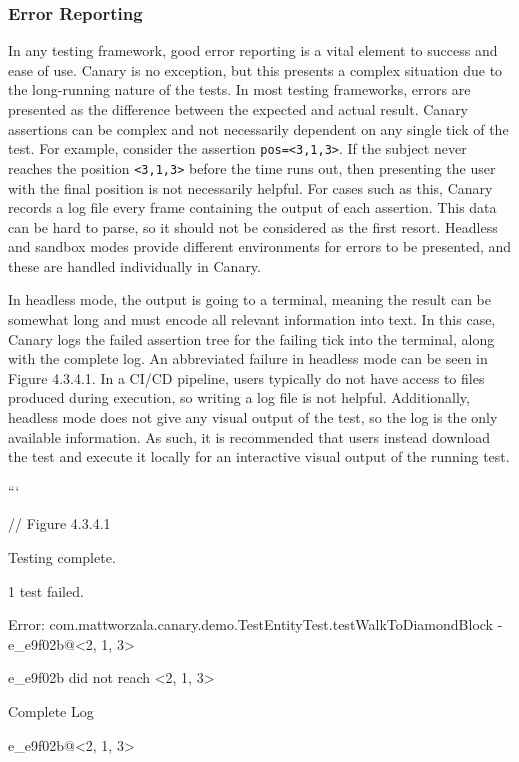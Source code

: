 \documentclass{article}
\def\code#1{\texttt{#1}}
\begin{document}
\begin{onehalfspacing}
\subsubsection{Error Reporting}

In any testing framework, good error reporting is a vital element to
success and ease of use. Canary is no exception, but this presents a
complex situation due to the long-running nature of the tests. In most
testing frameworks, errors are presented as the difference between the
expected and actual result. Canary assertions can be complex and not
necessarily dependent on any single tick of the test. For example,
consider the assertion \code{pos=\textless3,1,3\textgreater{}}. If the subject
never reaches the position \code{\textless3,1,3\textgreater{}} before the time
runs out, then presenting the user with the final position is not
necessarily helpful. For cases such as this, Canary records a log file
every frame containing the output of each assertion. This data can be
hard to parse, so it should not be considered as the first resort.
Headless and sandbox modes provide different environments for errors to
be presented, and these are handled individually in Canary.

In headless mode, the output is going to a terminal, meaning the result
can be somewhat long and must encode all relevant information into text.
In this case, Canary logs the failed assertion tree for the failing tick
into the terminal, along with the complete log. An abbreviated failure
in headless mode can be seen in Figure 4.3.4.1. In a CI/CD pipeline,
users typically do not have access to files produced during execution,
so writing a log file is not helpful. Additionally, headless mode does
not give any visual output of the test, so the log is the only available
information. As such, it is recommended that users instead download the
test and execute it locally for an interactive visual output of the
running test.

```

// Figure 4.3.4.1

Testing complete.

1 test failed.

Error: com.mattworzala.canary.demo.TestEntityTest.testWalkToDiamondBlock
- e\_e9f02b@\textless2, 1, 3\textgreater{}

e\_e9f02b did not reach \textless2, 1, 3\textgreater{}

Complete Log

e\_e9f02b@\textless2, 1, 3\textgreater{}


\end{onehalfspacing}
\end{document}
